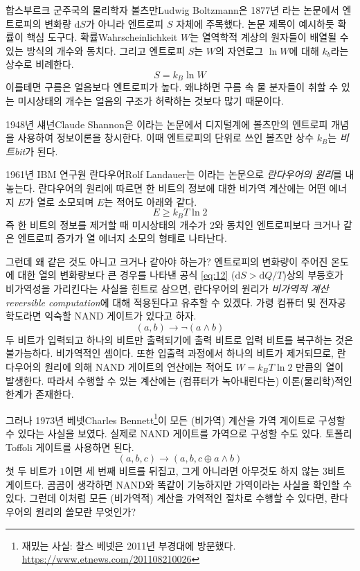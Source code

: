 \documentclass[a4paper,chapter,atbegshi]{oblivoir}
\begin{document}
합스부르크 군주국의 물리학자 볼츠만{\tiny Ludwig 
Boltzmann}은 1877년 라는 논문에서 엔트로피의 변화량 $\textrm{d}S$가
아니라 엔트로피 $S$ 자체에 주목했다. 논문 제목이 예시하듯 확률이 핵심 도구다. 
확률{\tiny Wahrscheinlichkeit} $W$는 열역학적 계상의 원자들이 배열될 수 있는 
방식의 개수와 동치다. 그리고 엔트로피 $S$는 $W$의 자연로그 $\ln W$에 대해
$k_b$라는 상수로 비례한다. 
\begin{equation}\label{eq:13}
  S=k_B\ln W
\end{equation}
이를테면 구름은 얼음보다 엔트로피가 높다. 왜냐하면 구름 속 물 분자들이
취할 수 있는 미시상태의 개수는 얼음의 구조가 허락하는 것보다 많기 때문이다.

1948년 섀넌{\tiny Claude Shannon}은 이라는 논문에서
디지털계에 볼츠만의 엔트로피 개념을 사용하여 정보이론을 창시한다. 이때 
엔트로피의 단위로 쓰인 볼츠만 상수 $k_B$는 \emph{비트\tiny bit}가 된다. 

1961년 IBM 연구원 란다우어{\tiny Rolf Landauer}는 이라는 논문으로 \emph{란다우어의 원리}를 내놓는다. 란다우어의 원리에 따르면
한 비트의 정보에 대한 비가역 계산에는 어떤 에너지 $E$가 열로 소모되며 $E$는 
적어도 아래와 같다. 
\begin{equation}
  E\geq k_B T \ln 2
\end{equation}
즉 한 비트의 정보를 제거할 때 미시상태의 개수가 $2$와 동치인 엔트로피보다 크거나
같은 엔트로피 증가가 열 에너지 소모의 형태로 나타난다. 

그런데 왜 같은 것도 아니고 크거나 같아야 하는가? 엔트로피의 변화량이 주어진 온도에
대한 열의 변화량보다 큰 경우를 나타낸 공식 \ref{eq:12} ($\textrm{d}S>
\textrm{d}Q/T$)상의 부등호가 비가역성을 가리킨다는 사실을 힌트로 삼으면,
란다우어의 원리가 \emph{비가역적 계산\tiny reversible computation}에 대해 
적용된다고 유추할 수 있겠다. 가령 컴퓨터 및 전자공학도라면 익숙할 NAND 게이트가
있다고 하자. 
\[
  (a,b) \rightarrow \neg(a \wedge b)
\]
두 비트가 입력되고 하나의 비트만 출력되기에 출력 비트로 입력 비트를 복구하는
것은 불가능하다. 비가역적인 셈이다. 또한 입출력 과정에서 하나의 비트가 제거되므로,
란다우어의 원리에 의해 NAND 게이트의 연산에는 적어도 $W=k_BT\ln2$ 만큼의 열이
발생한다. 따라서 수행할 수 있는 계산에는 (컴퓨터가 녹아내린다는) 이론(물리학)적인
한계가 존재한다. 

그러나 1973년 베넷{\tiny Charles Bennett}\footnote{재밌는 사실: 찰스 베넷은 2011년
부경대에 방문했다. \url{https://www.etnews.com/201108210026}}이 
모든 (비가역) 계산을 가역 게이트로 구성할 수 있다는 사실을 보였다. 
실제로 NAND 게이트를 가역으로 구성할 수도 있다. 토폴리{\tiny Toffoli} 게이트를
사용하면 된다. 
\[
  (a,b,c)\rightarrow(a,b,c\oplus a \wedge b)
\]
첫 두 비트가 $1$이면 세 번째 비트를 뒤집고, 그게 아니라면 아무것도
하지 않는 $3$비트 게이트다. 곰곰이 생각하면 NAND와 똑같이 기능하지만 가역이라는
사실을 확인할 수 있다. 그런데 이처럼 모든 (비가역적) 계산을 가역적인 절차로
수행할 수 있다면, 란다우어의 원리의 쓸모란 무엇인가? 
\end{document}
